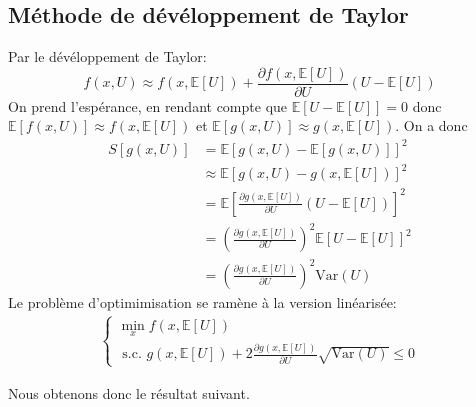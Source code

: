 \documentclass[a4paper, 11pt]{article}
\begin{document}
\subsection{Méthode de dévéloppement de Taylor}
Par le dévéloppement de Taylor:
\begin{equation}
    f(x,U) \approx f(x,\mathbb{E}[U]) + \frac{\partial f(x,\mathbb{E}[U])}{\partial U}(U - \mathbb{E}[U])
\end{equation}
On prend l'espérance, en rendant compte que $\mathbb{E}[U - \mathbb{E}[U]] = 0$ donc $\mathbb{E}[f(x,U)]\approx f(x,\mathbb{E}[U])$ et $\mathbb{E}[g(x,U)]\approx g(x,\mathbb{E}[U])$. On a donc 
\begin{align*}
    S[g(x,U)] &= \mathbb{E}[g(x,U) - \mathbb{E}[g(x,U)]]^2 \\ &\approx \mathbb{E}[g(x,U) - g(x,\mathbb{E}[U])]^2 \\
    &= \mathbb{E}\left[\frac{\partial g(x,\mathbb{E}[U])}{\partial U}(U - \mathbb{E}[U])\right]^2 \\
    &= \left( \frac{\partial g(x,\mathbb{E}[U])}{\partial U} \right)^2\mathbb{E}\left[U - \mathbb{E}[U]\right]^2 \\
    &= \left( \frac{\partial g(x,\mathbb{E}[U])}{\partial U} \right)^2 \text{Var}(U)
\end{align*}
Le problème d'optimimisation se ramène à la version linéarisée: 
\begin{align*}
    \begin{cases}
        \min_{x} f(x,\mathbb{E}[U]) \\
        \text{ s.c.    }  g(x,\mathbb{E}[U]) + 2\frac{\partial g(x,\mathbb{E}[U])}{\partial U}\sqrt{\text{Var}(U)} \leq 0
    \end{cases}
\end{align*}

Nous obtenons donc le résultat suivant.
\end{document}
